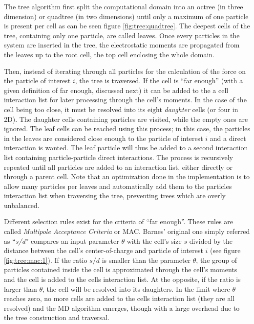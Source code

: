 The tree algorithm first split the computational domain into an octree (in
three dimension) or quadtree (in two dimensions) until
only a maximum of one particle is present per cell as can be seen figure
\ref{fig:tree:quadtree}. The deepest cells of the tree, containing only one particle,
are called leaves. Once every particles in the system are inserted in the tree,
the electrostatic moments are propagated from the leaves up to the root cell,
the top cell enclosing the whole domain.

Then, instead of iterating through all particles for the calculation of the
force on the particle of interest $i$, the tree is traversed. If the cell is
``far enough'' (with a given definition of far enough, discussed next) it can
be added to the a cell interaction list for later processing through the cell's
moments. In the case of
the cell being too close, it must be resolved into its  eight \textit{daughter}
cells (or four in 2D). The daughter cells containing particles are visited, while the empty
ones are ignored. The leaf cells can be reached using this process; in this
case, the particles in the leaves are considered close enough to the particle
of interest $i$ and a direct interaction is wanted. The leaf particle will thus
be added to a second interaction list containing particle-particle direct
interactions. The process is recursively repeated until all particles
are added to an interaction list, either directly or through a parent cell.
Note that an optimization done in the
implementation is to allow many particles per leaves and automatically add them
to the particles interaction list when traversing the tree, preventing trees
which are overly unbalanced.

Different selection rules exist for the criteria of ``far enough''. These
rules are called \textit{Multipole Acceptance Criteria} or
MAC\cite{Pfalzner1996}. Barnes' original one simply referred as
``\textit{s/d}'' compares an input parameter $\theta$ with the cell's size $s$
divided by the distance between the cell's center-of-charge and particle of
interest $i$ (see figure \ref{fig:tree:mac:1}).
If the ratio $s/d$ is smaller than the parameter $\theta$, the
group of particles contained inside the cell is approximated through the cell's
moments and the cell is added to the cells interaction list. At the opposite, if
the ratio is larger than $\theta$, the cell will be resolved into its daughters.
In the limit where $\theta$ reaches zero, no more cells are added to the
cells interaction list (they are all resolved) and the MD algorithm emerges, though
with a large overhead due to the tree construction and traversal.

